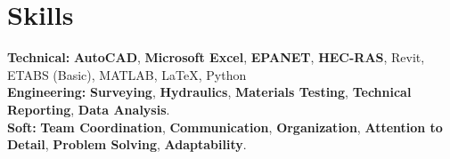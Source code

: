 \documentclass[11pt]{article}
\begin{document}
\section*{Skills}
\small{
\textbf{Technical:} \textbf{AutoCAD}, \textbf{Microsoft Excel}, \textbf{EPANET}, \textbf{HEC-RAS}, Revit, ETABS (Basic), MATLAB, LaTeX, Python \\
\textbf{Engineering:} \textbf{Surveying}, \textbf{Hydraulics}, \textbf{Materials Testing}, \textbf{Technical Reporting}, \textbf{Data Analysis}.  \\
\textbf{Soft:} \textbf{Team Coordination}, \textbf{Communication}, \textbf{Organization}, \textbf{Attention to Detail}, \textbf{Problem Solving}, \textbf{Adaptability}. 
}
\end{document}

